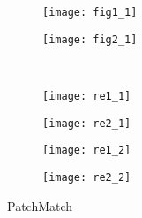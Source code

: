 \begin{figure}[H]
	\centering
	\begin{subfigure}[ht]{0.4\textwidth}
		\centering
		\texttt{[image: fig1\_1]}
	\end{subfigure}
	\quad
	\begin{subfigure}[ht]{0.4\textwidth}
		\centering
		\texttt{[image: fig2\_1]}
	\end{subfigure}\\
	\begin{subfigure}[ht]{0.4\textwidth}
		\centering
		\texttt{[image: re1\_1]}
	\end{subfigure}
	\quad
	\begin{subfigure}[ht]{0.4\textwidth}
		\centering
		\texttt{[image: re2\_1]}
	\end{subfigure}
\begin{subfigure}[ht]{0.4\textwidth}
	\centering
	\texttt{[image: re1\_2]}
\end{subfigure}
\quad
\begin{subfigure}[ht]{0.4\textwidth}
	\centering
	\texttt{[image: re2\_2]}
\end{subfigure}
	\caption{PatchMatch}
\end{figure}






